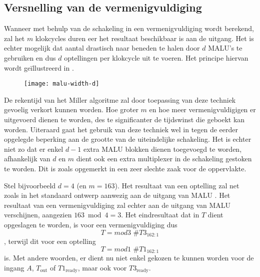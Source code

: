 
\subsection{Versnelling van de vermenigvuldiging}\label{subsectie-implementatie-gf2m-versnelling}

Wanneer met behulp van de schakeling in  een vermenigvuldiging wordt berekend, zal het $m$ klokcycles duren eer het resultaat beschikbaar is aan de uitgang. Het is echter mogelijk dat aantal drastisch naar beneden te halen door $d$ MALU's te gebruiken en dus $d$ optellingen per klokcycle uit te voeren. Het principe hiervan wordt ge\"illustreerd in .

\begin{figure}[h]
	\begin{center}
		\texttt{[image: malu-width-d]}
		\label{figuur-implementatie-wrapper-gf2m-d}
	\end{center}
\end{figure}

De rekentijd van het Miller algoritme zal door toepassing van deze techniek gevoelig verkort kunnen worden. Hoe groter $m$ en hoe meer vermenigvuldigigen er uitgevoerd dienen te worden, des te significanter de tijdswinst die geboekt kan worden. Uiteraard gaat het gebruik van deze techniek wel in tegen de eerder opgelegde beperking aan de grootte van de uiteindelijke schakeling. Het is echter niet zo dat er enkel $d - 1$ extra MALU blokken dienen toegevoegd te worden, afhankelijk van $d$ en $m$ dient ook een extra multiplexer in de schakeling gestoken te worden. Dit is zoals opgemerkt in  een zeer slechte zaak voor de  oppervlakte.

Stel bijvoorbeeld $d = 4$ (en $m = 	163$). Het resultaat van een optelling zal net zoals in het standaard ontwerp aanwezig aan de uitgang van MALU . Het resultaat van een vermenigvuldiging zal echter aan de uitgang van MALU  verschijnen, aangezien $163 \bmod 4 = 3$. Het eindresultaat dat in $T$ dient opgeslagen te worden, is voor een vermenigvuldiging dus
\[T = mod3 \text{ \# } T3_{162:1}\]
, terwijl dit voor een optelling
\[T = mod1 \text{ \# } T1_{162:1}\]
is. Met andere woorden, er dient nu niet enkel gekozen te kunnen worden voor de ingang $A$, $T_{\text{out}}$ of $T1_{\text{ready}}$, maar ook voor $T3_{\text{ready}}$.

